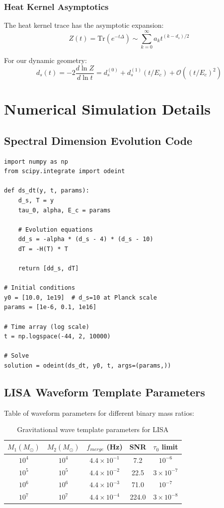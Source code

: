 \documentclass[12pt,a4paper]{article}
\begin{document}
\subsubsection{Heat Kernel Asymptotics}

The heat kernel trace has the asymptotic expansion:
\begin{equation}
    Z(t) = \text{Tr}(e^{-t\Delta}) \sim \sum_{k=0}^\infty a_k t^{(k-d_s)/2}
\end{equation}

For our dynamic geometry:
\begin{equation}
    d_s(t) = -2 \frac{d\ln Z}{d\ln t} = d_s^{(0)} + d_s^{(1)}(t/E_c) + \mathcal{O}((t/E_c)^2)
\end{equation}

\section{Numerical Simulation Details}

\subsection{Spectral Dimension Evolution Code}

\begin{verbatim}
import numpy as np
from scipy.integrate import odeint

def ds_dt(y, t, params):
    d_s, T = y
    tau_0, alpha, E_c = params
    
    # Evolution equations
    dd_s = -alpha * (d_s - 4) * (d_s - 10)
    dT = -H(T) * T
    
    return [dd_s, dT]

# Initial conditions
y0 = [10.0, 1e19]  # d_s=10 at Planck scale
params = [1e-6, 0.1, 1e16]

# Time array (log scale)
t = np.logspace(-44, 2, 10000)

# Solve
solution = odeint(ds_dt, y0, t, args=(params,))
\end{verbatim}

\subsection{LISA Waveform Template Parameters}

Table of waveform parameters for different binary mass ratios:

\begin{table}[h]
\centering
\begin{tabular}{ccccc}
\toprule
$M_1 (M_\odot)$ & $M_2 (M_\odot)$ & $f_{merge}$ (Hz) & SNR & $\tau_0$ limit \\
\midrule
$10^4$ & $10^4$ & $4.4\times 10^{-1}$ & 7.2 & $10^{-6}$ \\
$10^5$ & $10^5$ & $4.4\times 10^{-2}$ & 22.5 & $3\times 10^{-7}$ \\
$10^6$ & $10^6$ & $4.4\times 10^{-3}$ & 71.0 & $10^{-7}$ \\
$10^7$ & $10^7$ & $4.4\times 10^{-4}$ & 224.0 & $3\times 10^{-8}$ \\
\bottomrule
\end{tabular}
\caption{Gravitational wave template parameters for LISA}
\end{table}
\end{document}
